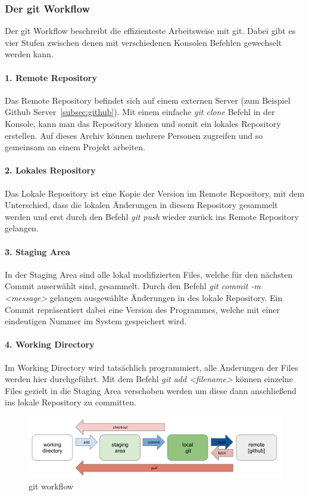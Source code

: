 \subsubsection{Der git Workflow}
Der git Workflow beschreibt die effizienteste Arbeitsweise mit git.
Dabei gibt es vier Stufen zwischen denen mit verschiedenen Konsolen Befehlen gewechselt werden kann.

\paragraph{1. Remote Repository}
Das Remote Repository befindet sich auf einem externen Server (zum Beispiel Github Server~\ref{subsec:github}).
Mit einem einfache \emph{git clone} Befehl in der Konsole, kann man das Repository klonen und somit ein lokales Repository erstellen.
Auf dieses Archiv können mehrere Personen zugreifen und so gemeinsam an einem Projekt arbeiten.

\paragraph{2. Lokales Repository}
Das Lokale Repository ist eine Kopie der Version im Remote Repository, mit dem Unterschied, dass die lokalen Änderungen in
diesem Repository gesammelt werden und erst durch den Befehl \emph{git push} wieder zurück ins Remote Repository gelangen.

\paragraph{3. Staging Area}
In der Staging Area sind alle lokal modifizierten Files, welche für den nächsten Commit auserwählt sind, gesammelt.
Durch den Befehl \emph{git commit -m <message>} gelangen ausgewählte Änderungen in des lokale Repository.
Ein Commit repräsentiert dabei eine Version des Programmes, welche mit einer eindeutigen Nummer im System gespeichert wird.

\paragraph{4. Working Directory}
Im Working Directory wird tatsächlich programmiert, alle Änderungen der Files werden hier durchgeführt.
Mit dem Befehl \emph{git add <filename>} können einzelne Files gezielt in die Staging Area verschoben werden um diese
dann anschließend ins lokale Repository zu committen.

\begin{figure}[hbt!]
    \centering
    \includegraphics[scale=0.4]{pics/git-workflow}
    \caption{git workflow~\cite{git-workflow}}
    \label{fig:git-workflow}
\end{figure}

